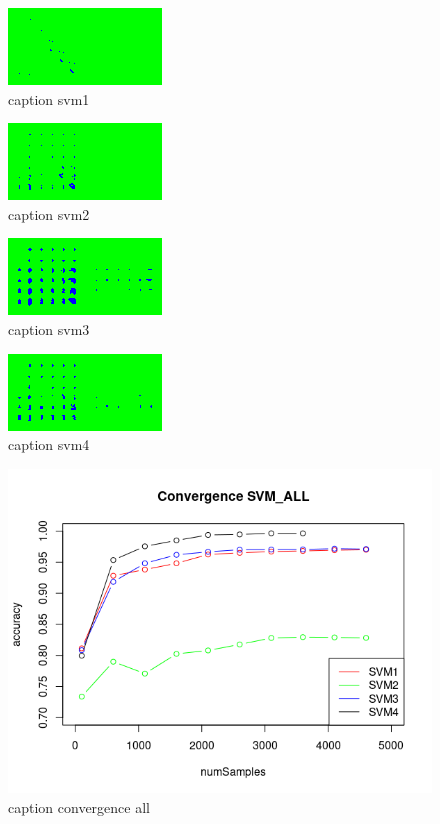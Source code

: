 \documentclass[11pt]{article}
\begin{document}
\begin{figure}[H]
	\centering
	\includegraphics[width=.45\textwidth]{../testdata/svm1.png}
	\caption{caption svm1}
	\label{svm1}
\end{figure}
\begin{figure}[H]
	\centering
	\includegraphics[width=.45\textwidth]{../testdata/svm2.png}
	\caption{caption svm2}
	\label{svm2}
\end{figure}
\begin{figure}[H]
	\centering
	\includegraphics[width=.45\textwidth]{../testdata/svm3.png}
	\caption{caption svm3}
	\label{svm3}
\end{figure}
\begin{figure}[H]
	\centering
	\includegraphics[width=.45\textwidth]{../testdata/svm4.png}
	\caption{caption svm4}
	\label{svm4}
\end{figure}
\begin{figure}[H]
	\centering
	\includegraphics[width=.45\textwidth]{../testdata/convergence_all.png}
	\caption{caption convergence all}
	\label{convergence all svms}
\end{figure}
\end{document}
